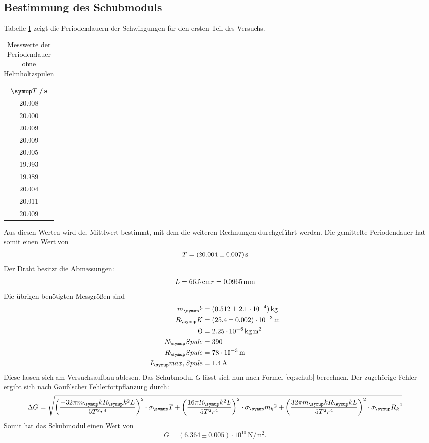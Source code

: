 \subsection{Bestimmung des Schubmoduls}
Tabelle \ref{tab:data1} zeigt die Periodendauern der Schwingungen für den ersten
Teil des Versuchs.
\begin{table}
  \centering
  \begin{tabular}{c}
    \toprule
    $\su{T}$\,/\,s \\
    \midrule
    20.008 \\
    20.000 \\
    20.009 \\
    20.009 \\
    20.005 \\
    19.993 \\
    19.989 \\
    20.004 \\
    20.011 \\
    20.009 \\
    \bottomrule
  \end{tabular}
  \caption{Messwerte der Periodendauer ohne Helmholtzspulen}
  \label{tab:data1}
\end{table}
Aus diesen Werten wird der Mittlwert bestimmt, mit dem die weiteren Rechnungen
durchgeführt werden. Die gemittelte Periodendauer hat somit einen Wert von
\begin{equation*}
  T = (20.004 \pm 0.007)\,\si{\second}
\end{equation*}
Der Draht besitzt die Abmessungen:
\begin{align*}
  L = 66.5 \,\si{\centi\meter}
  r = 0.0965 \,\si{\milli\meter}
\end{align*}
Die übrigen benötigten Messgrößen sind
\begin{align*}
  m_\su{k} &= (0.512 \pm 2.1\cdot10^{-4})\kg \\
  R_\su{K} &= (25.4 \pm 0.002)\cdot10^{-3}\mt\\
  \Theta   &=  2.25\cdot10^{-6}\,\si{\kilo\gram\square\meter}\\
  N_\su{Spule} &= 390\\
  R_\su{Spule} &= 78\cdot10^{-3}\mt\\
  I_\su{max,Spule} &= 1.4\Amp
\end{align*}
Diese lassen sich am Versuchsaufbau ablesen. %
Das Schubmodul $G$ lässt sich nun nach Formel \eqref{eq:schub} berechnen. Der
zugehörige Fehler ergibt sich nach Gauß'scher Fehlerfortpflanzung durch:
\begin{equation*}
  \Delta G = \sqrt{\left(\frac{-32\pi m_\su{k} R_\su{k}^2 L}{5T^3 r^4}\right)^2
  \cdot\sigma_\su{T} + \left(\frac{16\pi R_\su{k}^2L}{5T^2r^4}\right)^2\cdot
  \sigma_\su{m_k}^2+\left(\frac{32\pi m_\su{k}R_\su{k}L}{5T^2r^4}\right)^2\cdot
  \sigma_\su{R_k}^2}
\end{equation*}
Somit hat das Schubmodul einen Wert von
\begin{equation*}
  G = (6.364 \pm 0.005)\cdot10^{10}\,\si{\newton\per\square\meter}.
\end{equation*}
